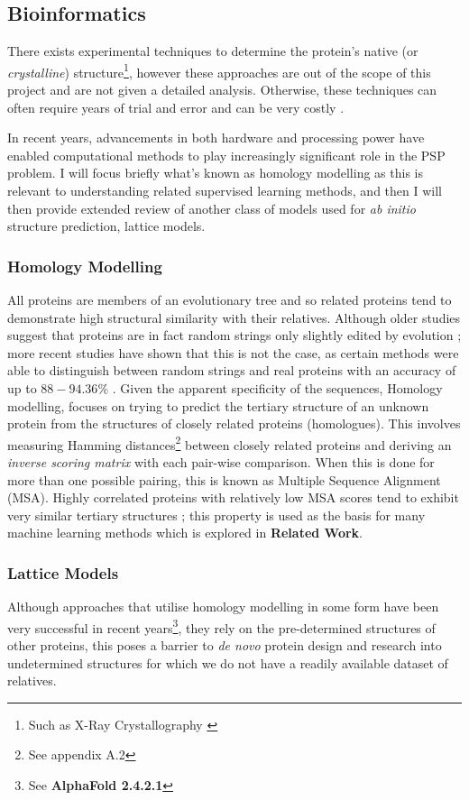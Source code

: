 \subsection{Bioinformatics}
There exists experimental techniques to determine the protein's
native (or \emph{crystalline}) structure\footnote{Such as X-Ray Crystallography \cite{Chayen}},
however these approaches are out of the scope of this
project and are not given a detailed analysis. Otherwise,
these techniques can often require years of trial and error 
and can be very costly \cite{alberts}.

In recent years, advancements in both hardware and processing power
have enabled computational methods to play increasingly significant role 
in the PSP problem. I will focus briefly what's known
as homology modelling as this is relevant to understanding related
supervised learning methods, and then I will then provide extended review
of another class of models used for \emph{ab initio} structure prediction,
lattice models.
\subsubsection{Homology Modelling}
All proteins are members of an evolutionary tree and so related
proteins tend to demonstrate high structural similarity with their relatives.
Although older studies suggest that proteins are in fact random strings
only slightly edited by evolution \cite{weiss}; more recent studies
have shown that this is not the case, as certain methods
were able to distinguish between random strings and real proteins
with an accuracy of up to $88-94.36\%$ \cite{delucrezia,Tsygvintsev}.
Given the apparent specificity of the sequences,
Homology modelling, focuses on trying to predict 
the tertiary structure of an unknown protein
from the structures of closely related proteins (homologues).
This involves measuring Hamming distances\footnote{See appendix A.2} 
between closely related proteins and deriving an \emph{inverse scoring matrix}
with each pair-wise comparison. When this is done for more than
one possible pairing, this is known as Multiple Sequence Alignment (MSA).
Highly correlated proteins with relatively low MSA scores tend to exhibit
very similar tertiary structures \cite{lesk}; this property is used as the basis for many
machine learning methods which is explored in \textbf{Related Work}.
\subsubsection{Lattice Models}
Although approaches that utilise homology modelling in some form
have been very successful in recent years\footnote{See \textbf{AlphaFold 2.4.2.1}},
they rely on the pre-determined structures of other proteins, this poses
a barrier to \emph{de novo} protein design and research into undetermined structures
for which we do not have a readily available dataset of relatives.


